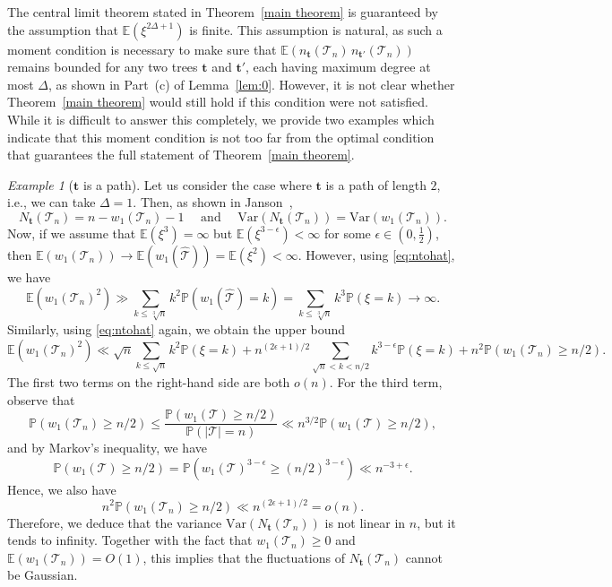 \documentclass[article]{amsart}
\newcommand{\Prob} {\mathbb {P}}
\newcommand{\prob}[1]{\Prob\left(#1\right)}
\newcommand{\tc}{\mathcal{T}}
\newcommand{\htc}{\hat{\tc}}
\newcommand{\st}{\textbf{t}}
\newcommand{\N}{N_{\st}}
\newcommand{\n}{n_{\st}}
\newcommand{\E}{\mathbb{E}}
\theoremstyle{definition}
\theoremstyle{remark}
\newtheorem{example}[theorem]{Example}
\begin{document}
 The central limit theorem stated in Theorem~\ref{main theorem} is guaranteed by the assumption that $\E(\xi^{2\Delta+1})$ is finite. This assumption is natural, as such a moment condition is necessary to make sure that $\E(\n(\tc_n)\, n_{\st'}(\tc_n))$ remains bounded for any two trees $\st$ and $\st'$, each having maximum degree at most $\Delta$, as shown in Part~(c) of Lemma~\ref{lem:0}. However, it is not clear whether Theorem~\ref{main theorem} would still hold if this condition were not satisfied. While it is difficult to answer this completely, we provide two examples which indicate that this moment condition is not too far from the optimal condition that guarantees the full statement of Theorem~\ref{main theorem}.
  
\begin{example}[$\st$ is a path]
   Let us consider the case where $\st$ is a path of length $2$, i.e., we can take $\Delta=1$. Then, as shown in Janson~\cite{J21}, 
    \[
    \N(\tc_n)=n-w_1(\tc_n)-1\quad \text{ and } \quad \mathrm{Var} (\N(\tc_n))=\mathrm{Var}(w_1(\tc_n)).
    \]
    Now, if we assume that $\E(\xi^3)=\infty$ but $\E(\xi^{3-\epsilon})<\infty$ for some $\epsilon \in (0, \tfrac{1}{2})$, then $\E (w_1(\tc_n))\to \E(w_1(\htc))=\E(\xi^2)<\infty$. However, using \eqref{eq:ntohat}, we have
    \[
    \E (w_1(\tc_n)^2)\gg \sum_{k\leq \sqrt[3]{n}}k^2\Prob(w_1(\htc)=k)=\sum_{k\leq \sqrt[3]{n}}k^3\Prob(\xi=k) \to\infty.
    \]
    Similarly, using \eqref{eq:ntohat} again, we obtain the upper bound
    \[
    \E (w_1(\tc_n)^2)\ll \sqrt{n}\sum_{k\leq \sqrt{n}} k^2\Prob(\xi=k)+  n^{(2\epsilon+1)/2}\sum_{\sqrt{n}<k< n/2} k^{3-\epsilon}\Prob(\xi=k)+n^2\prob{w_1(\tc_n)\geq n/2}.
    \]
    The first two terms on the right-hand side are both $o(n)$. For the third term, observe that
    \[
    \prob{w_1(\tc_n)\geq n/2} \leq \frac{\prob{w_1(\tc)\geq n/2}}{\prob{|\tc|=n}} \ll n^{3/2}\prob{w_1(\tc)\geq n/2}, 
    \]
    and by Markov's inequality, we have 
    \[
    \prob{w_1(\tc)\geq n/2} = \prob{w_1(\tc)^{3-\epsilon}\geq (n/2)^{3-\epsilon}}\ll n^{-3+\epsilon}.
    \]
    Hence, we also have 
    \[
    n^2\prob{w_1(\tc_n)\geq n/2} \ll n^{(2\epsilon+1)/2}=o(n).
    \]
    Therefore, we deduce that the variance $\mathrm{Var}(\N(\tc_n))$ is not linear in $n$, but it tends to infinity. Together with the fact that $w_1(\tc_n)\geq 0$ and $\E(w_1(\tc_n)) = O(1)$, this implies that the fluctuations of $\N(\tc_n)$ cannot be Gaussian.
    
    
\end{example}  
\end{document}
